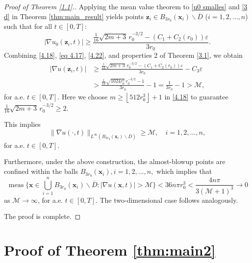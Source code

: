 \documentclass[11pt,reqno,oneside]{amsart}
\numberwithin{equation}{section}
\theoremstyle{definition}
\theoremstyle{remark}
\numberwithin{equation}{section}
\begin{document}
\begin{proof}[Proof of Theorem \ref{1.1}.]
	Applying the mean value theorem to \eqref{u0 smalles} and \eqref{3 d} in Theorem \ref{thm:main_result} yields points $\mathbf{z}_i \in B_{3r_0}(\mathbf{x}_i) \backslash \overline{D}$ ($i=1,2,\dots,n$) such that for all $t \in [0,T]$:
	\begin{equation}\label{4.22}
		|\nabla u_0(\mathbf{z}_i,t)| \geqslant \frac{
			\tfrac{1}{16}\sqrt{2m+3} \, r_0^{-3/2} - \left(C_1 + C_2(r_0)\right)\varepsilon
		}{3r_0}.
	\end{equation}
	Combining \eqref{4.18}, \eqref{eq 4.17}, \eqref{4.22}, and properties 2 of Theorem \ref{3.1}, we obtain
	\begin{equation*}
		\begin{aligned}
			|\nabla u(\mathbf{z}_i,t)| &\geqslant \frac{
				\tfrac{1}{16}\sqrt{2m+3} \, r_0^{-3/2} - \left(C_1 + C_2(r_0)\right)\varepsilon
			}{3r_0} - C_3\varepsilon\\
			& >\frac{
				\tfrac{1}{16}\sqrt{1024r_0^3} \, r_0^{-3/2} - 1
			}{3r_0} - 1=\frac{1}{3r_0}-1>\mathcal{M},
		\end{aligned}
	\end{equation*}
	for a.e. $t \in [0,T]$. Here we choose $m \geqslant \left\lfloor 512 r_0^3 \right\rfloor + 1 $ in \eqref{4.18} to guarantee $\tfrac{1}{16}\sqrt{2m+3} \, r_0^{-3/2}\geqslant 2$.
	
	This implies
	\begin{equation*}
		\|\nabla u(\cdot,t)\|_{L^{\infty} (B_{3r_0}(\mathbf{x}_i) \backslash \overline{D})} \geq \mathcal{M}, \quad i=1,2,\dots,n,
	\end{equation*}
	for a.e. $t \in [0,T]$.
	
	Furthermore, under the above construction, the almost-blowup points are confined within the balls $B_{3r_0}(\mathbf{x}_i),i=1,2,...,n,$ which implies that 
	\begin{equation*}
		\operatorname{meas}\big\{ \mathbf{x} \in \bigcup_{i=1}^{n} B_{3r_0}(\mathbf{x}_i)\backslash \overline{D} :|\nabla u(\mathbf{x},t)|  > \mathcal{M} \big\} < 36n\pi r_0^3 < \frac{4n\pi}{3(\mathcal{M} + 1)^3}  \to 0
	\end{equation*}
	as $\mathcal{M} \to \infty$, for a.e. $t \in [0,T]$. The two-dimensional case follows analogously.
	
	The proof is complete.
\end{proof}
	
	\section{Proof of Theorem \ref{thm:main2}}\label{sec:5}
	
\end{document}
